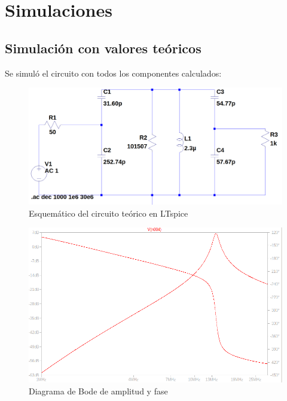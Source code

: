 \section{Simulaciones}
\subsection{Simulación con valores teóricos}
Se simuló el circuito con todos los componentes calculados:
\begin{figure}[!h]
    \centering
    \includegraphics[scale=0.2]{Imagenes/Circuito teorico.png}
    \caption{Esquemático del circuito teórico en LTspice}
    \label{fig:Circteo}
\end{figure}

\begin{figure}[!h]
    \centering
    \includegraphics[scale=0.4]{Imagenes/db_f.png}
    \caption{Diagrama de Bode de amplitud y fase}
    \label{fig:Circteo}
\end{figure}

